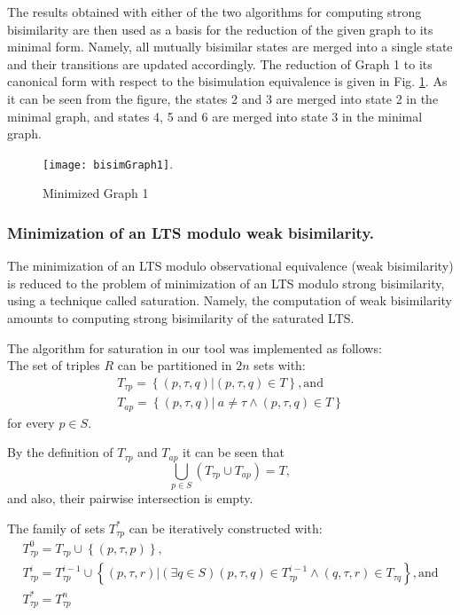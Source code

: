 The results obtained with either of the two algorithms for computing strong bisimilarity are then used as a basis for the reduction of the given graph to its minimal form. Namely, all mutually bisimilar states are merged into a single state and their transitions are updated accordingly. The reduction of Graph 1 to its canonical form with respect to the bisimulation equivalence is given in Fig.  \ref{fig:bisimGraph1}. As it can be seen from the figure, the states 2 and 3 are merged into state 2 in the minimal graph, and states 4, 5 and 6 are merged into state 3 in the minimal graph.

\begin{figure}[!ht]
\centering
\texttt{[image: bisimGraph1]}.
\caption{Minimized Graph 1}
\label{fig:bisimGraph1}
\end{figure}

\subsubsection{Minimization of an LTS modulo weak bisimilarity.}
The minimization of an LTS modulo observational equivalence (weak bisimilarity) is reduced to the problem of minimization of an LTS modulo strong bisimilarity, using a technique called saturation. Namely, the computation of weak bisimilarity amounts to computing strong bisimilarity of the saturated LTS. 

The algorithm for saturation in our tool was implemented as follows:\\
The set of triples ${R}$ can be partitioned in ${2n}$ sets with: 
\begin{equation*}
	\begin{array}{lcl}
 		{T_{\tau p}=\left\{\left(p,\tau,q\right)| \left(p,\tau,q\right)\in T\right\}}, \text{and}\\
    {T_{ap}=\left\{\left(p,\tau,q\right)|\ a\neq\tau\wedge\left(p,\tau,q\right)\in T\right\}}
  \end{array}
\end{equation*} 
for every ${p\in S}$.

By the definition of ${T_{\tau p}}$ and ${T_{ap}}$ it can be seen that
\begin{equation*}
 {\bigcup_{p\in S}\left(T_{\tau p}\cup T_{ap}\right)=T},
\end{equation*} 
and also, their pairwise intersection is empty. 

The family of sets ${T^{*}_{\tau p}}$ can be iteratively constructed with:
\begin{equation*}
	\begin{array}{lcl}
		{T^{0}_{\tau p}=T_{\tau p}\cup\left\{\left(p,\tau,p\right)\right\}},\\
		{T^{i}_{\tau p}=T^{i-1}_{\tau p}\cup\left\{\left(p,\tau,r\right)|\left(\exists q\in S\right)\left(p,\tau,q\right)\in T^{i-1}_{\tau p}\wedge\left(q,\tau,r\right)\in T_{\tau q}\right\}}, \text{and} \\
		{T^{*}_{\tau p}=T^{n}_{\tau p}}
	\end{array}
\end{equation*}

